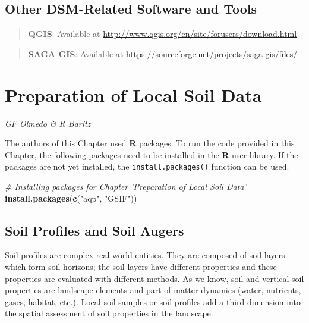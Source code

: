 \documentclass[10pt,b5paper,]{book}
\newenvironment{Shaded}{\begin{snugshade}}{\end{snugshade}}
\newcommand{\CommentTok}[1]{\textcolor[rgb]{0.56,0.35,0.01}{\textit{#1}}}
\newcommand{\KeywordTok}[1]{\textcolor[rgb]{0.13,0.29,0.53}{\textbf{#1}}}
\newcommand{\NormalTok}[1]{#1}
\newcommand{\StringTok}[1]{\textcolor[rgb]{0.31,0.60,0.02}{#1}}
\theoremstyle{definition}
\theoremstyle{definition}
\theoremstyle{definition}
\theoremstyle{remark}
\begin{document}
\hypertarget{other-dsm-related-software-and-tools}{%
\section{Other DSM-Related Software and
Tools}\label{other-dsm-related-software-and-tools}}

\begin{quote}
\textbf{QGIS}: Available at
\url{http://www.qgis.org/en/site/forusers/download.html}
\end{quote}

\begin{quote}
\textbf{SAGA GIS}: Available at
\url{https://sourceforge.net/projects/saga-gis/files/}
\end{quote}

\hypertarget{preparation}{%
\chapter{Preparation of Local Soil Data}\label{preparation}}

\emph{GF Olmedo \& R Baritz}

The authors of this Chapter used \textbf{R} packages. To run the code
provided in this Chapter, the following packages need to be installed in
the \textbf{R} user library. If the packages are not yet installed, the
\texttt{install.packages()} function can be used.

\begin{Shaded}
\begin{Highlighting}[]
\CommentTok{# Installing packages for Chapter 'Preparation of Local Soil Data'}
\KeywordTok{install.packages}\NormalTok{(}\KeywordTok{c}\NormalTok{(}\StringTok{"aqp"}\NormalTok{, }\StringTok{"GSIF"}\NormalTok{))}
\end{Highlighting}
\end{Shaded}

\hypertarget{soil-profiles-and-soil-augers}{%
\section{Soil Profiles and Soil
Augers}\label{soil-profiles-and-soil-augers}}

Soil profiles are complex real-world entities. They are composed of soil
layers which form soil horizons; the soil layers have different
properties and these properties are evaluated with different methods. As
we know, soil and vertical soil properties are landscape elements and
part of matter dynamics (water, nutrients, gases, habitat, etc.). Local
soil samples or soil profiles add a third dimension into the spatial
assessment of soil properties in the landscape.
\end{document}
